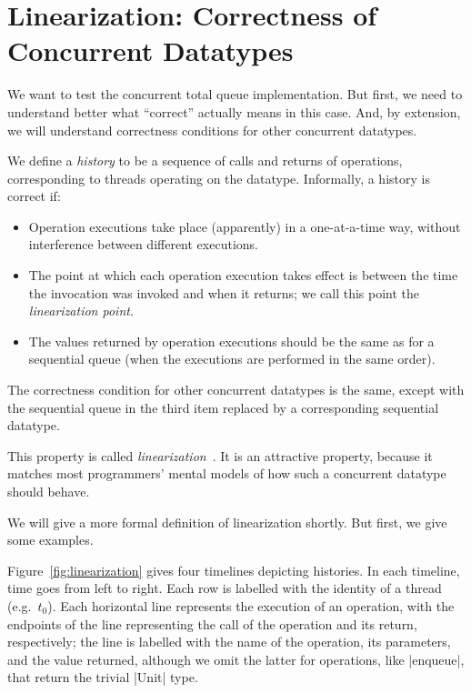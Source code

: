 \section{Linearization: Correctness of Concurrent Datatypes}
\label{sec:linearization}

We want to test the concurrent total queue implementation.  But first, we need
to understand better what ``correct'' actually means in this case.  And, by
extension, we will understand correctness conditions for other concurrent
datatypes. 

We define a \emph{history} to be a sequence of calls and returns of
operations, corresponding to threads operating on the datatype.
Informally, a history is correct if:
%
\begin{itemize}
\item Operation executions take place (apparently) in a one-at-a-time
  way, without interference between different executions.

\item The point at which each operation execution takes effect is between the
time the invocation was invoked and when it returns; we call this point
the \emph{linearization point}.

\item The values returned by operation executions should be the same as for a
sequential queue (when the executions are performed in the same order).
\end{itemize}
%
The correctness condition for other concurrent datatypes is the same, except
with the sequential queue in the third item replaced by a corresponding
sequential datatype.

This property is called \emph{linearization}~\cite{herlihy-wing}.  It is an
attractive property, because it matches most programmers' mental models of how
such a concurrent datatype should behave.

We will give a more formal definition of linearization shortly.  But first, we
give some examples.  

Figure~\ref{fig:linearization} gives four timelines depicting histories.  In
each timeline, time goes from left to right.  Each row is labelled with the
identity of a thread (e.g.~$t_0$).  Each horizontal line represents the
execution of an operation, with the endpoints of the line representing the
call of the operation and its return, respectively; the line is labelled with
the name of the operation, its parameters, and the value returned, although we
omit the latter for operations, like |enqueue|, that return the trivial |Unit|
type.

